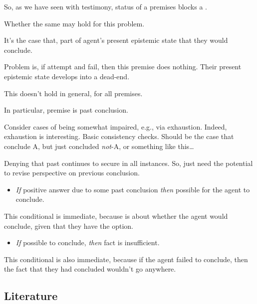 \begin{note}[Premises]
  So, as we have seen with testimony, status of a premises blocks a \requ{}.

  Whether the same may hold for this problem.

  It's the case that, part of agent's present epistemic state that they would conclude.

  Problem is, if attempt and fail, then this premise does nothing.
  Their present epistemic state develops into a dead-end.
\end{note}

\begin{note}[Note!]
  This doesn't hold in general, for all premises.

  In particular, premise is past conclusion.

  Consider cases of being somewhat impaired, e.g., via exhaustion.
  Indeed, exhaustion is interesting.
  Basic consistency checks.
  Should be the case that conclude A, but just concluded \emph{not}-A, or something like this\dots

  Denying that past continues to secure in all instances.
  So, just need the potential to revise perspective on previous conclusion.
\end{note}

\begin{note}
  \begin{itemize}
  \item
    \emph{If} positive answer due to some past conclusion \emph{then} possible for the agent to conclude.
  \end{itemize}
  This conditional is immediate, because \qzS{} is about whether the agent would conclude, given that they have the option.
  \begin{itemize}
  \item
    \emph{If} possible to conclude, \emph{then} fact is insufficient.
  \end{itemize}
  This conditional is also immediate, because if the agent failed to conclude, then the fact that they had concluded wouldn't go anywhere.
\end{note}


\subsection{Literature}
\label{sec:literature}

\subsubsection{}
\label{sec:carroll}

